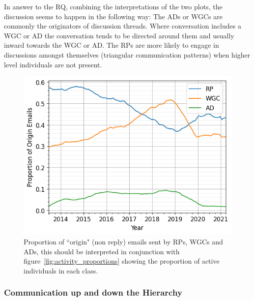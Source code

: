 \documentclass[twocolumn,10pt]{article}
\newlength{\figureWidthOneColumn}
\begin{document}
In answer to the RQ, combining the interpretations of the two plots, the
discussion seems to happen in the following way: The ADs or WGCs are
commonly the originators of discussion threads. Where conversation includes
a WGC or AD the conversation tends to be directed around them and usually
inward towards the WGC or AD. The RPs are more likely to engage in
discussions amongst themselves (triangular communication patterns) when
higher level individuals are not present. 

\begin{figure}[t]
  \centering
  \includegraphics[width=\figureWidthOneColumn]{figures-prev/icwsm-2024/Origin_email_proportions.png}
  \caption{
    Proportion of ``origin" (non reply) emails sent by RPs, WGCs and ADs,
    this should be interpreted in conjunction with
    figure~\ref{fig:activity_proportions} showing the proportion of active
    individuals in each class.
  }
  \label{fig:origin_emails}
\end{figure}

\subsubsection{Communication up and down the Hierarchy}
\label{sec:org-dynamics:hierarchy:rq3}


\end{document}
